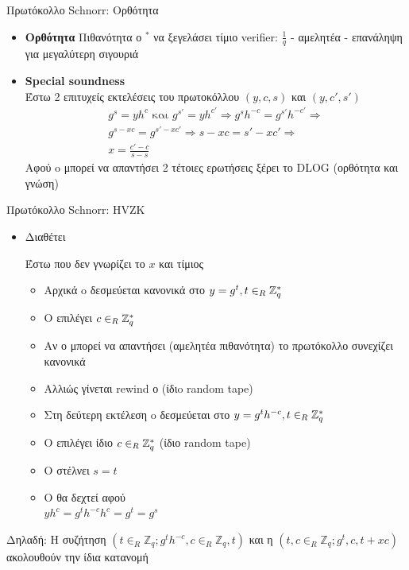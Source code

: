 \documentclass[handout]{beamer}
\begin{document}
\begin{frame}{Πρωτόκολλο Schnorr: Ορθότητα}
\begin{itemize}
\item \textbf{Ορθότητα} 
Πιθανότητα ο \prv$^*$ να ξεγελάσει τίμιο verifier: $\frac{1}{q}$ - αμελητέα - επανάληψη για μεγαλύτερη σιγουριά
\pause
\item \textbf{Special soundness}\\
Έστω 2 επιτυχείς εκτελέσεις του πρωτοκόλλου $(y,c,s)$ και $(y,c',s')$
\pause
\begin{align*}
 g^s = yh^c  \text{ και }  g^{s'} = yh^{c'}  \Rightarrow  g^s h^{-c}   = g^{s'} h^{-c'}  \Rightarrow \\
 g^{s-xc} = g^{s'-xc'} \Rightarrow  s-xc = s'-xc' \Rightarrow \\
 x = \frac{c'-c}{s-s}
\end{align*}
\pause
Αφού o \prv μπορεί να απαντήσει 2 τέτοιες ερωτήσεις ξέρει το DLOG
(ορθότητα και γνώση)
\end{itemize}
\end{frame}


\begin{frame}{Πρωτόκολλο Schnorr: HVZK}
\begin{itemize}
\item Διαθέτει 

Έστω  \siml που δεν γνωρίζει το $x$ και τίμιος \ver 
\pause
\begin{itemize}
\item Αρχικά o \siml δεσμεύεται κανονικά στο $y=g^t, t \in_R \mathbb{Z}^*_{q}$
\pause
\item Ο \ver επιλέγει $c \in_R \mathbb{Z}^*_{q}$
\pause
\item Αν ο \siml μπορεί να απαντήσει (αμελητέα πιθανότητα) το πρωτόκολλο συνεχίζει κανονικά \pause
\item Αλλιώς γίνεται rewind ο \ver (ίδιo random tape) \pause
\item Στη δεύτερη εκτέλεση o \siml δεσμεύεται στο $y=g^t h^{-c}, t \in_R \mathbb{Z}^*_{q}$ \pause
\item Ο \ver επιλέγει ίδιο $c \in_R \mathbb{Z}^*_{q}$ (ίδιο random tape) \pause
\item O \siml στέλνει $s=t$ \pause
\item Ο \ver θα δεχτεί αφού \\
$yh^{c} = g^t  h^{-c} h^{c} = g^t = g^s$ \\
\end{itemize}
\end{itemize}
\pause
 
\begin{block}{Δηλαδή:}
Η συζήτηση $(t \in_R \mathbb{Z}_q; g^t h^{-c}   , c \in_R \mathbb{Z}_q  , t )$ 
 και η $(t,c \in_R \mathbb{Z}_q;  g^t  , c  , t+xc  )$
 ακολουθούν την ίδια κατανομή
 \end{block}
\end{frame}
\end{document}
